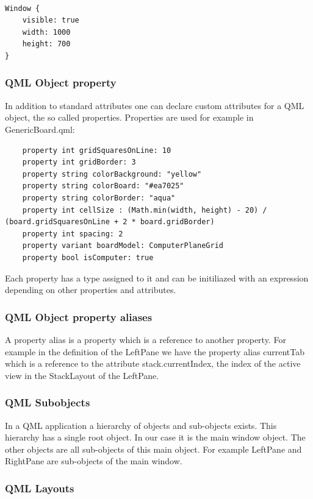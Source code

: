 \begin{lstlisting}

Window {
	visible: true
	width: 1000
	height: 700
}

\end{lstlisting}

\subsubsection {QML Object property}

In addition to standard attributes one can declare custom attributes for a QML object, the so called properties. Properties are used for example in GenericBoard.qml:

\begin{lstlisting}
	property int gridSquaresOnLine: 10
	property int gridBorder: 3
	property string colorBackground: "yellow"
	property string colorBoard: "#ea7025"
	property string colorBorder: "aqua"
	property int cellSize : (Math.min(width, height) - 20) / (board.gridSquaresOnLine + 2 * board.gridBorder)
	property int spacing: 2
	property variant boardModel: ComputerPlaneGrid
	property bool isComputer: true
\end{lstlisting}

Each property has a type assigned to it and can be initiliazed with an expression depending on other properties and attributes.

\subsubsection {QML Object property aliases}

A property alias is a property which is a reference to another property. For example in the definition of the LeftPane we have the property alias currentTab which is a reference to the attribute stack.currentIndex, the index of the active view in the StackLayout of the LeftPane. 

\subsubsection {QML Subobjects}

In a QML application a hierarchy of objects and sub-objects exists. This hierarchy has a single root object. In our case it is the main window object. The other objects are all sub-objects of this main object. 
For example LeftPane and RightPane are sub-objects of the main window. 

\subsubsection {QML Layouts}

